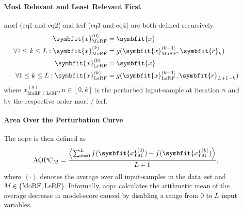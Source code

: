 \paragraph{Most Relevant and Least Relevant First}
\gls{morf} (eq1 and eq2) and \gls{lerf} (eq3 and eq4) are both defined recursively 
\begin{align}
    \symbfit{x}^{(0)}_{\text{MoRF}} &= \symbfit{x} \\
    \forall{1 \leq k \leq L}: \symbfit{x}^{(k)}_{\text{MoRF}} &= g(\symbfit{x}^{(k-1)}_{\text{MoRF}}, \symbfit{r}_k) \\
    \symbfit{x}^{(0)}_{\text{LeRF}} &= \symbfit{x} \\
    \forall{1 \leq k \leq L}: \symbfit{x}^{(k)}_{\text{LeRF}} &= g(\symbfit{x}^{(k-1)}_{\text{LeRF}}, \symbfit{r}_{L+1-k})
\end{align}
where \(x^{(n)}_{\text{MoRF / LeRF}}, n \in [0, k]\) is the perturbed input-sample at iteration \(n\) and by the respective order \gls{morf} / \gls{lerf}.

\paragraph{Area Over the Perturbation Curve}
The \gls{aopc} is then defined as
\[
    \text{AOPC}_M = \dfrac{\left< \sum_{k=0}^{L} f(\symbfit{x}^{(0)}_{M}) - f(\symbfit{x}^{(k)}_{M}) \right>}{L+1},
\]
where \(\left< \cdot \right>\) denotes the average over all input-samples in the \mbox{data set} and \(M \in \{\text{MoRF}, \text{LeRF}\}\). Informally, \gls{aopc} calculates the arithmetic mean of the average decrease in model-score caused by disabling a range from \(0\) to \(L\) input variables.

